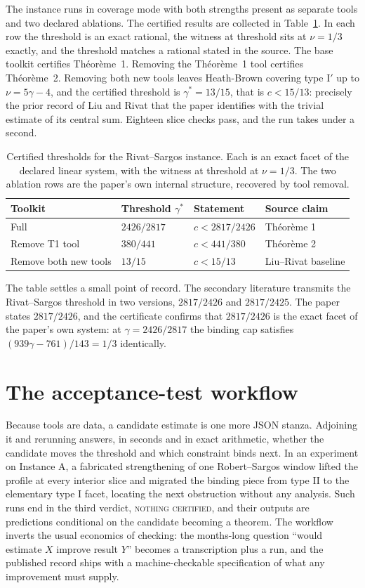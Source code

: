 \documentclass[11pt]{article}
\begin{document}
The instance runs in coverage mode with both strengths present as
separate tools and two declared ablations. The certified results are
collected in Table~\ref{tab:rs}. In each row the threshold is an exact
rational, the witness at threshold sits at $\nu=1/3$ exactly, and the
threshold matches a rational stated in the source. The base toolkit
certifies Th\'eor\`eme~1. Removing the Th\'eor\`eme~1 tool certifies
Th\'eor\`eme~2. Removing both new tools leaves Heath-Brown covering
type $\mathrm{I}'$ up to $\nu=5\gamma-4$, and the certified threshold
is $\gamma^*=13/15$, that is $c<15/13$: precisely the prior record of
Liu and Rivat \cite{liu-rivat} that the paper identifies with the
trivial estimate of its central sum. Eighteen slice checks pass, and
the run takes under a second.

\begin{table}[ht]
\centering
\begin{tabular}{@{}llll@{}}
\toprule
Toolkit & Threshold $\gamma^*$ & Statement & Source claim\\
\midrule
Full & $2426/2817$ & $c<2817/2426$ & Th\'eor\`eme 1\\
Remove T1 tool & $380/441$ & $c<441/380$ & Th\'eor\`eme 2\\
Remove both new tools & $13/15$ & $c<15/13$ & Liu--Rivat baseline\\
\bottomrule
\end{tabular}
\caption{Certified thresholds for the Rivat--Sargos instance. Each is
an exact facet of the declared linear system, with the witness at
threshold at $\nu=1/3$. The two ablation rows are the paper's own
internal structure, recovered by tool removal.}
\label{tab:rs}
\end{table}

The table settles a small point of record. The secondary literature
transmits the Rivat--Sargos threshold in two versions, $2817/2426$ and
$2817/2425$. The paper states $2817/2426$, and the certificate
confirms that $2817/2426$ is the exact facet of the paper's own
system: at $\gamma=2426/2817$ the binding cap satisfies
$(939\gamma-761)/143=1/3$ identically.

\section{The acceptance-test workflow}\label{sec:acceptance}

Because tools are data, a candidate estimate is one more JSON stanza.
Adjoining it and rerunning answers, in seconds and in exact
arithmetic, whether the candidate moves the threshold and which
constraint binds next. In an experiment on Instance A, a fabricated
strengthening of one Robert--Sargos window lifted the profile at every
interior slice and migrated the binding piece from type II to the
elementary type I facet, locating the next obstruction without any
analysis. Such runs end in the third verdict, \textsc{nothing
certified}, and their outputs are predictions conditional on the
candidate becoming a theorem. The workflow inverts the usual economics
of checking: the months-long question ``would estimate $X$ improve
result $Y$'' becomes a transcription plus a run, and the published
record ships with a machine-checkable specification of what any
improvement must supply.
\end{document}
